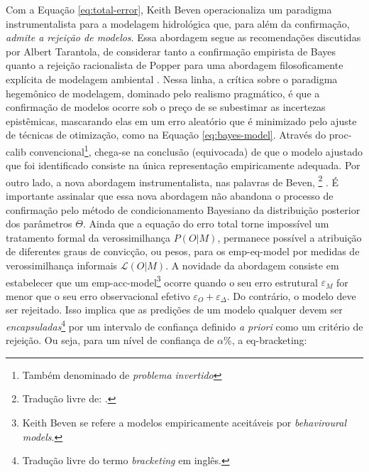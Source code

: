 \documentclass[./main.tex]{subfiles}
\begin{document}
\par Com a Equação \eqref{eq:total-error}, Keith Beven operacionaliza um paradigma instrumentalista para a modelagem hidrológica que, para além da confirmação, \textit{admite a rejeição de modelos}. Essa abordagem segue as recomendações discutidas por Albert Tarantola, de considerar tanto a confirmação empirista de Bayes quanto a rejeição racionalista de Popper para uma abordagem filosoficamente explícita de modelagem ambiental \cite{Tarantola2006}. Nessa linha, a crítica sobre o paradigma hegemônico de modelagem, dominado pelo realismo pragmático, é que a confirmação de modelos ocorre sob o preço de se subestimar as incertezas epistêmicas, mascarando elas em um erro aleatório que é minimizado pelo ajuste de técnicas de otimização, como na Equação \eqref{eq:bayes-model}. Através do \gls{proc-calib} convencional\footnote{Também denominado de \textit{problema invertido}}, chega-se na conclusão (equivocada) de que o modelo ajustado que foi identificado consiste na única representação empiricamente adequada. Por outro lado, a nova abordagem instrumentalista, nas palavras de Beven, \footnote{Tradução livre de: .} \cite{Beven2009}. É importante assinalar que essa nova abordagem não abandona o processo de confirmação pelo método de condicionamento Bayesiano da distribuição posterior dos parâmetros $\Theta$. Ainda que a equação do erro total torne impossível um tratamento formal da verossimilhança $P(O|M)$, permanece possível a atribuição de diferentes graus de convicção, ou pesos, para os \gls{emp-eq-model} por medidas de verossimilhança informais $\mathcal{L}(O|M)$. A novidade da abordagem consiste em estabelecer que um \gls{emp-acc-model}\footnote{Keith Beven se refere a modelos empiricamente aceitáveis por \textit{behaviroural models}.} ocorre quando o seu erro estrutural $\varepsilon_M$ for menor que o seu erro observacional efetivo $\varepsilon_O + \varepsilon_{\Delta}$. Do contrário, o modelo deve ser rejeitado. Isso implica que as predições de um modelo qualquer devem ser \textit{encapsuladas}\footnote{Tradução livre do termo \textit{ bracketing} em inglês.} por um intervalo de confiança definido \textit{a priori} como um critério de rejeição. Ou seja, para um nível de confiança de $\alpha$\%, a \gls{eq-bracketing}:
\end{document}
